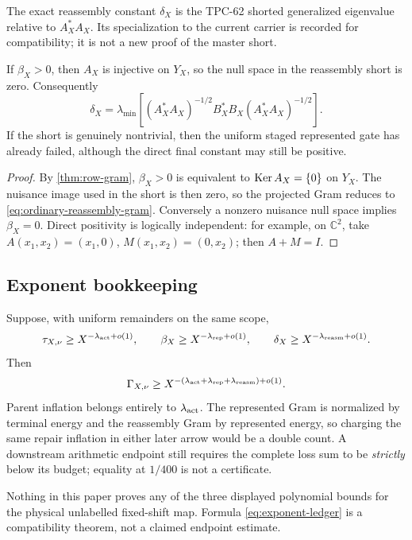 The exact reassembly constant \(\delta_X\) is the TPC-62 shorted generalized
eigenvalue relative to \(A_X^*A_X\). Its specialization to the current carrier
is recorded for compatibility; it is not a new proof of the master short.

\begin{proposition}\label{prop:short-collapse}
If \(\beta_X>0\), then \(A_X\) is injective on \(Y_X\), so the null space in
the reassembly short is zero. Consequently
\begin{equation}\label{eq:ordinary-reassembly-gram}
 \delta_X=\lambda_{\min}\!\left[
 (A_X^*A_X)^{-1/2}B_X^*B_X(A_X^*A_X)^{-1/2}
 \right].
\end{equation}
If the short is genuinely nontrivial, then the uniform staged represented
gate has already failed, although the direct final constant may still be
positive.
\end{proposition}

\begin{proof}
By \cref{thm:row-gram}, \(\beta_X>0\) is equivalent to
\(\operatorname{Ker} A_X=\{0\}\) on \(Y_X\). The nuisance image used in the short is then
zero, so the projected Gram reduces to \eqref{eq:ordinary-reassembly-gram}.
Conversely a nonzero nuisance null space implies \(\beta_X=0\). Direct
positivity is logically independent: for example, on \(\mathbb C^2\), take
\(A(x_1,x_2)=(x_1,0)\), \(M(x_1,x_2)=(0,x_2)\); then \(A+M=I\).
\end{proof}

\subsection{Exponent bookkeeping}
Suppose, with uniform remainders on the same scope,
\[
 \tau_{X,\nu}\ge X^{-\lambda_{\rm act}+o(1)},\qquad
 \beta_X\ge X^{-\lambda_{\rm rep}+o(1)},\qquad
 \delta_X\ge X^{-\lambda_{\rm reasm}+o(1)}.
\]
Then
\begin{equation}\label{eq:exponent-ledger}
 \Gamma_{X,\nu}
 \ge X^{-(\lambda_{\rm act}+\lambda_{\rm rep}
                 +\lambda_{\rm reasm})+o(1)}.
\end{equation}
Parent inflation belongs entirely to \(\lambda_{\rm act}\). The represented
Gram is normalized by terminal energy and the reassembly Gram by represented
energy, so charging the same repair inflation in either later arrow would be a
double count. A downstream arithmetic endpoint still requires the complete
loss sum to be \emph{strictly} below its budget; equality at \(1/400\) is not a
certificate.

Nothing in this paper proves any of the three displayed polynomial bounds for
the physical unlabelled fixed-shift map. Formula \eqref{eq:exponent-ledger} is
a compatibility theorem, not a claimed endpoint estimate.
